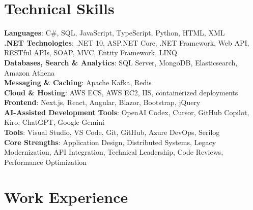\documentclass[a4paper,12pt]{article}
\begin{document}
\section{\textbf{Technical Skills}}
 \begin{itemize}[leftmargin=0.1in, label={}]
    \small{\item{
     \textbf{Languages}{: C\#, SQL, JavaScript, TypeScript, Python, HTML, XML} \\
     \textbf{.NET Technologies}{: .NET 10, ASP.NET Core, .NET Framework, Web API, RESTful APIs, SOAP, MVC, Entity Framework, LINQ} \\
     \textbf{Databases, Search \& Analytics}{: SQL Server, MongoDB, Elasticsearch, Amazon Athena} \\
     \textbf{Messaging \& Caching}{: Apache Kafka, Redis} \\
     \textbf{Cloud \& Hosting}{: AWS ECS, AWS EC2, IIS, containerized deployments} \\
     \textbf{Frontend}{: Next.js, React, Angular, Blazor, Bootstrap, jQuery} \\
\textbf{AI-Assisted Development Tools}{: OpenAI Codex, Cursor, GitHub Copilot, Kiro, ChatGPT, Google Gemini} \\
     \textbf{Tools}{: Visual Studio, VS Code, Git, GitHub, Azure DevOps, Serilog} \\
     \textbf{Core Strengths}{: Application Design, Distributed Systems, Legacy Modernization, API Integration, Technical Leadership, Code Reviews, Performance Optimization} \\
    }}
 \end{itemize}

\section{Work Experience}
\end{document}
